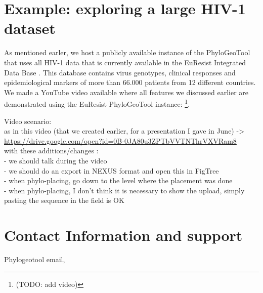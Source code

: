 \documentclass[a4paper, 11pt]{article} %
\begin{document}
\section{Example: exploring a large HIV-1 dataset}

As mentioned earler, we host a publicly available instance of the PhyloGeoTool that uses all HIV-1 data that is currently available in the EuResist Integrated Data Base \cite{Zazzi2012}. 
This database contains virus genotypes, clinical responses and epidemiological markers of more than 66.000 patients from 12 different countries.
We made a YouTube video available where all features we discussed earlier are demonstrated using the EuResist PhyloGeoTool instance: \footnote{(TODO: add video)}.

Video scenario:\\
 as in this video (that we created earlier, for a presentation I gave in June) -> \url{https://drive.google.com/open?id=0B-0JA80u3ZPTbVVTNThrVXVRam8} \\
 with these additions/changes :\\  
 - we should talk during the video \\
 - we should do an export in NEXUS format and open this in FigTree \\
 - when phylo-placing, go down to the level where the placement was done\\
 - when phylo-placing, I don't think it is necessary to show the upload, simply pasting the sequence in the field is OK \\



\section{Contact Information and support }

Phylogeotool email, 






\end{document}
